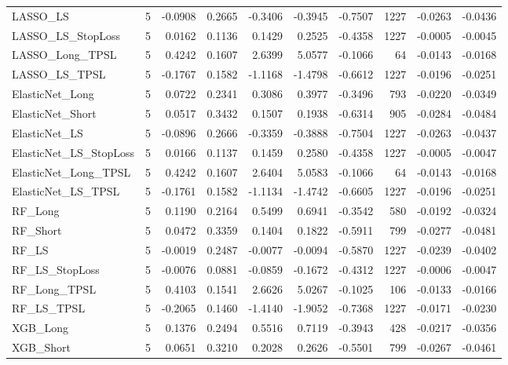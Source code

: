 \begin{tabular}{llrrrrrrrr}
\cline{1-10}
LASSO\_LS & 5 & -0.0908 & 0.2665 & -0.3406 & -0.3945 & -0.7507 & 1227 & -0.0263 & -0.0436 \\
\cline{1-10}
LASSO\_LS\_StopLoss & 5 & 0.0162 & 0.1136 & 0.1429 & 0.2525 & -0.4358 & 1227 & -0.0005 & -0.0045 \\
\cline{1-10}
LASSO\_Long\_TPSL & 5 & 0.4242 & 0.1607 & 2.6399 & 5.0577 & -0.1066 & 64 & -0.0143 & -0.0168 \\
\cline{1-10}
LASSO\_LS\_TPSL & 5 & -0.1767 & 0.1582 & -1.1168 & -1.4798 & -0.6612 & 1227 & -0.0196 & -0.0251 \\
\cline{1-10}
ElasticNet\_Long & 5 & 0.0722 & 0.2341 & 0.3086 & 0.3977 & -0.3496 & 793 & -0.0220 & -0.0349 \\
\cline{1-10}
ElasticNet\_Short & 5 & 0.0517 & 0.3432 & 0.1507 & 0.1938 & -0.6314 & 905 & -0.0284 & -0.0484 \\
\cline{1-10}
ElasticNet\_LS & 5 & -0.0896 & 0.2666 & -0.3359 & -0.3888 & -0.7504 & 1227 & -0.0263 & -0.0437 \\
\cline{1-10}
ElasticNet\_LS\_StopLoss & 5 & 0.0166 & 0.1137 & 0.1459 & 0.2580 & -0.4358 & 1227 & -0.0005 & -0.0047 \\
\cline{1-10}
ElasticNet\_Long\_TPSL & 5 & 0.4242 & 0.1607 & 2.6404 & 5.0583 & -0.1066 & 64 & -0.0143 & -0.0168 \\
\cline{1-10}
ElasticNet\_LS\_TPSL & 5 & -0.1761 & 0.1582 & -1.1134 & -1.4742 & -0.6605 & 1227 & -0.0196 & -0.0251 \\
\cline{1-10}
RF\_Long & 5 & 0.1190 & 0.2164 & 0.5499 & 0.6941 & -0.3542 & 580 & -0.0192 & -0.0324 \\
\cline{1-10}
RF\_Short & 5 & 0.0472 & 0.3359 & 0.1404 & 0.1822 & -0.5911 & 799 & -0.0277 & -0.0481 \\
\cline{1-10}
RF\_LS & 5 & -0.0019 & 0.2487 & -0.0077 & -0.0094 & -0.5870 & 1227 & -0.0239 & -0.0402 \\
\cline{1-10}
RF\_LS\_StopLoss & 5 & -0.0076 & 0.0881 & -0.0859 & -0.1672 & -0.4312 & 1227 & -0.0006 & -0.0047 \\
\cline{1-10}
RF\_Long\_TPSL & 5 & 0.4103 & 0.1541 & 2.6626 & 5.0267 & -0.1025 & 106 & -0.0133 & -0.0166 \\
\cline{1-10}
RF\_LS\_TPSL & 5 & -0.2065 & 0.1460 & -1.4140 & -1.9052 & -0.7368 & 1227 & -0.0171 & -0.0230 \\
\cline{1-10}
XGB\_Long & 5 & 0.1376 & 0.2494 & 0.5516 & 0.7119 & -0.3943 & 428 & -0.0217 & -0.0356 \\
\cline{1-10}
XGB\_Short & 5 & 0.0651 & 0.3210 & 0.2028 & 0.2626 & -0.5501 & 799 & -0.0267 & -0.0461 \\

\end{tabular}
